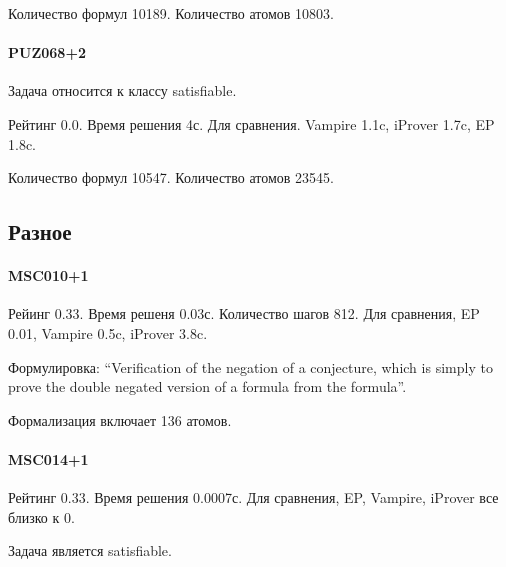 Количество формул 10189. Количество атомов 10803.


\paragraph{PUZ068+2}
Задача относится к классу satisfiable.

Рейтинг 0.0. Время решения 4с. Для сравнения. Vampire 1.1c, iProver 1.7c, EP 1.8c.


Количество формул 10547. Количество атомов 23545.




\subsection{Разное}





\paragraph{MSC010+1}
Рейинг 0.33. Время решеня 0.03с. Количество шагов 812. Для сравнения, EP 0.01, Vampire 0.5c, iProver 3.8c.

Формулировка: ``Verification of the negation of a conjecture, which is simply to prove the double negated version of a formula from the formula''.

Формализация включает 136 атомов.



\paragraph{MSC014+1}
Рейтинг 0.33. Время решения 0.0007с. Для сравнения, EP, Vampire, iProver все близко к 0.

Задача является satisfiable.

